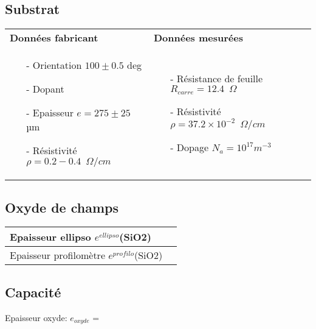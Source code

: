 \documentclass[11pt]{article}
\begin{document}
\subsection{Substrat}
\begin{center}
    \noindent \begin{tabular}[!htb]{ | p{7cm} | p{7cm} |}
    \hline
    \textbf{Donn\'ees fabricant} & \textbf{Donn\'ees mesur\'ees} \\
    \begin{itemize}
    	\item[-] Orientation $100 \pm 0.5$ deg
    	\item[-] Dopant
    	\item[-] Epaisseur $e = 275 \pm 25$ µm
    	\item[-] R\'esistivit\'e $\rho = 0.2 - 0.4 \phantom{2} \Omega/cm$
    \end{itemize}
     &
	\begin{itemize}
    	\item[-] R\'esistance de feuille
    		$R_{carre} = 12.4 \phantom{2} \Omega$
    	\item[-] R\'esistivit\'e $\rho = 37.2 \times 10^{-2}  \phantom{2} \Omega/cm$
    	\item[-] Dopage      $N_a = 10^{17} m^{-3}$
    \end{itemize}
    \\
    \hline
    \end{tabular}
\end{center}

\subsection{Oxyde de champs}
	
	\begin{center}
    \noindent \begin{tabular}[!htb]{ | p{7cm} | p{7cm} | }
    \hline
    Epaisseur ellipso $e^{ellipso}$(SiO2) & \\ \hline
    Epaisseur profilom\`etre    $e^{profilo}$(SiO2) & \\ 
    \hline
    \end{tabular}
    \end{center}

\subsection{Capacit\'e}

Epaisseur oxyde: $e_{oxyde}$ = 
\end{document}

